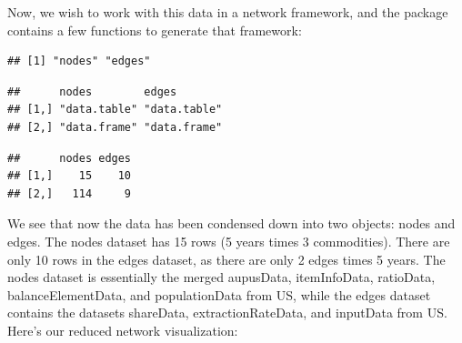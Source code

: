 \documentclass[nojss]{jss}
\begin{document}
Now, we wish to work with this data in a network framework, and the package
contains a few functions to generate that framework:

\begin{knitrout}
\color{fgcolor}\begin{kframe}
\begin{alltt}
 \hlkwb{=} \hlstd{(} 
                                           
\end{alltt}
\begin{verbatim}
## [1] "nodes" "edges"
\end{verbatim}
\begin{alltt}
\end{alltt}
\begin{verbatim}
##      nodes        edges       
## [1,] "data.table" "data.table"
## [2,] "data.frame" "data.frame"
\end{verbatim}
\begin{alltt}
\end{alltt}
\begin{verbatim}
##      nodes edges
## [1,]    15    10
## [2,]   114     9
\end{verbatim}
\end{kframe}
\end{knitrout}

We see that now the data has been condensed down into two objects: nodes and
edges.  The nodes dataset has 15 rows (5 years times 3 commodities).
There are only 10 rows in the edges dataset, as there are only 2 edges times
5 years.  The nodes dataset is essentially the merged aupusData, itemInfoData,
ratioData, balanceElementData, and populationData from US, while the edges
dataset contains the datasets shareData, extractionRateData, and inputData from
US.  Here's our reduced network visualization:
\end{document}

